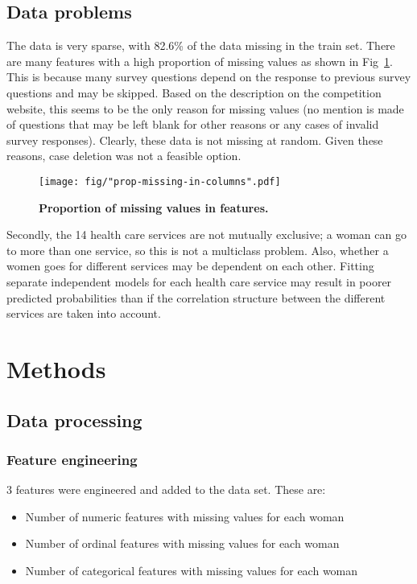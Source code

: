 \documentclass{article}\usepackage[]{graphicx}\usepackage[]{color}
\begin{document}
\subsection{Data problems}
The data is very sparse, with 82.6\% of the data missing in the train set. There are many features with a high proportion of missing values as shown in Fig~\ref{fig-missing}. This is because many survey questions depend on the response to previous survey questions and may be skipped. Based on the description on the competition website, this seems to be the only reason for missing values (no mention is made of questions that may be left blank for other reasons or any cases of invalid survey responses). Clearly, these data is not missing at random. Given these reasons, case deletion was not a feasible option.

\begin{figure}[htbp]
\begin{center}
\texttt{[image: fig/"prop-missing-in-columns".pdf]}
\caption{\textbf{Proportion of missing values in features.}}
\label{fig-missing}
\end{center}
\end{figure}

Secondly, the 14 health care services are not mutually exclusive; a woman can go to more than one service, so this is not a multiclass problem. Also, whether a women goes for different services may be dependent on each other. Fitting separate independent models for each health care service may result in poorer predicted probabilities than if the correlation structure between the different services are taken into account.
\section{Methods}
\label{sec:methods}

\subsection{Data processing}
\subsubsection{Feature engineering}
3 features were engineered and added to the data set. These are:
  \begin{itemize}
\item Number of numeric features with missing values for each woman
\item Number of ordinal features with missing values for each woman
\item Number of categorical features with missing values for each woman
\end{itemize}
\end{document}
